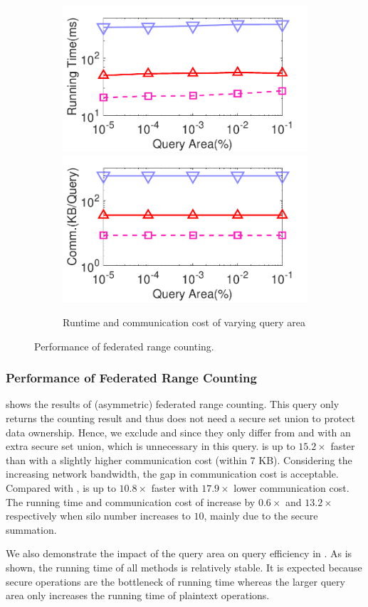 \begin{figure}[t]
    \begin{subfigure}{0.48\textwidth}
        \centering
        \includegraphics[width=0.48\linewidth]{rangecount_area_time.pdf}
        \includegraphics[width=0.48\linewidth]{rangecount_area_cost.pdf}
        \caption{Runtime and communication cost of varying query area}
        \label{fig:count-eff-r-area}
    \end{subfigure}
    \caption{Performance of federated range counting.}
    \label{fig:count-eff}
\end{figure}

\subsubsection{Performance of Federated Range Counting}
\label{sec:exp-asym-rc}

 shows the results of (asymmetric) federated range counting.
This query only returns the counting result and thus does not need a secure set union to protect data ownership.
Hence, we exclude \smcqlext and \conclaveext since they only differ from \smcql and \conclave with an extra secure set union, which is unnecessary in this query.
\sysname is up to $15.2\times$ faster than \smcql with a slightly higher communication cost (within 7 KB). 
Considering the increasing network bandwidth, the gap in communication cost is acceptable.
Compared with \conclave, \sysname is up to $10.8 \times$ faster with $17.9 \times$ lower communication cost.
The running time and communication cost of \sysname increase by $0.6 \times$ and $13.2 \times$ respectively when silo number increases to $10$, mainly due to the secure summation.

We also demonstrate the impact of the query area on query efficiency in .
As is shown, the running time of all methods is relatively stable. 
It is expected because secure operations are the bottleneck of running time whereas the larger query area only increases the running time of plaintext operations.

